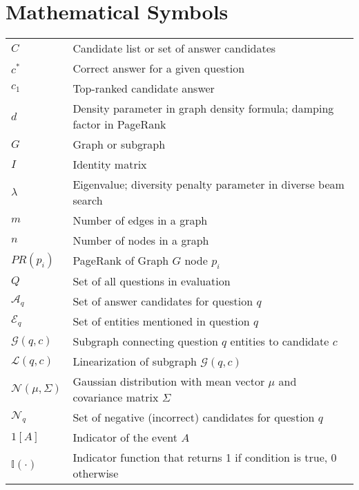 \section*{Mathematical Symbols}
\begin{tabularx}{0.9\textwidth}{lX}
    $C$ & Candidate list or set of answer candidates \\
    $c^*$ & Correct answer for a given question \\
    $c_1$ & Top-ranked candidate answer \\
    $d$ & Density parameter in graph density formula; damping factor in PageRank \\
    $G$ & Graph or subgraph \\
    $I$ & Identity matrix \\
    $\lambda$ & Eigenvalue; diversity penalty parameter in diverse beam search \\
    $m$ & Number of edges in a graph \\
    $n$ & Number of nodes in a graph \\
    $PR(p_i)$ & PageRank of Graph $G$ node $p_i$ \\
    $Q$ & Set of all questions in evaluation \\
    $\mathcal{A}_q$ & Set of answer candidates for question $q$ \\
    $\mathcal{E}_q$ & Set of entities mentioned in question $q$ \\
    $\mathcal{G}(q, c)$ & Subgraph connecting question $q$ entities to candidate $c$ \\
    $\mathcal{L}(q, c)$ & Linearization of subgraph $\mathcal{G}(q, c)$ \\
    $\mathcal{N}(\mu, \Sigma)$ & Gaussian distribution with mean vector $\mu$ and covariance matrix $\Sigma$\\
    $\mathcal{N}_q$ & Set of negative (incorrect) candidates for question $q$ \\
    $1\left[A\right]$ & Indicator of the event $A$ \\
    $\mathbb{I}(\cdot)$ & Indicator function that returns 1 if condition is true, 0 otherwise \\
\end{tabularx}